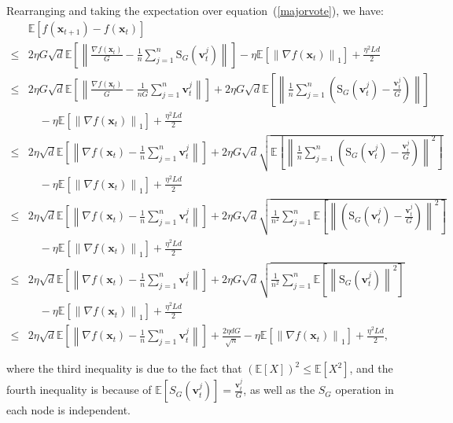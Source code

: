 \documentclass{article}
\newcommand{\E}{\mathbb{E}}
\newcommand{\Norm}[1]{\left\|#1\right\|}
\def \E {\mathbb{E}}
\def \v {\mathbf{v}}
\def \x {\mathbf{x}}
\def \E {\mathbb{E}}
\def \x {\mathbf{x}}
\def \v {\mathbf{v}}
\begin{document}
Rearranging and taking the expectation over equation~(\ref{majorvote}), we have:
\begin{equation}\label{majorvote2}
    \begin{split}
&\E\left[f(\x_{t+1}) - f(\x_t)\right]\\
\leq& 2\eta G\sqrt{d}  \E\left[ \Norm{\frac{\nabla f(\x_t)}{G} - \frac{1}{n}\sum_{j=1}^n \operatorname{S_\textit{G}}(\v_t^j)} \right]-\eta \E\left[ \Norm{ \nabla f(\x_t)}_1 \right]+ \frac{\eta^2 Ld}{2} \\
\leq &  2\eta G\sqrt{d}   \E\left[\Norm{ \frac{\nabla f(\x_t)}{G} - \frac{1}{nG}\sum_{j=1}^n \v_t^j}\right]+ 2\eta G\sqrt{d} \E\left[  \Norm{ \frac{1}{n}\sum_{j=1}^n \left(\operatorname{S_\textit{G}}(\v_t^j)-\frac{\v_t^j}{G}\right)} \right]\\
&\quad -\eta \E\left[ \Norm{\nabla f(\x_{t}) }_1\right]+ \frac{\eta^2 Ld}{2}\\
\leq &  2\eta\sqrt{d}   \E\left[\Norm{ \nabla f(\x_t) - \frac{1}{n}\sum_{j=1}^n \v_t^j}\right]+ 2\eta G\sqrt{d} \sqrt{\E\left[  \Norm{ \frac{1}{n}\sum_{j=1}^n \left(\operatorname{S_\textit{G}}(\v_t^j)-\frac{\v_t^j}{G}\right)}^2 \right]}\\
&\quad -\eta \E\left[ \Norm{\nabla f(\x_{t}) }_1\right]+ \frac{\eta^2 Ld}{2}\\
\leq &  2\eta\sqrt{d}   \E\left[\Norm{ \nabla f(\x_t) - \frac{1}{n}\sum_{j=1}^n \v_t^j}\right]+ 2\eta G\sqrt{d} \sqrt{\frac{1}{n^2}\sum_{j=1}^n\E\left[  \Norm{  \left(\operatorname{S_\textit{G}}(\v_t^j)-\frac{\v_t^j}{G}\right)}^2 \right]}\\
&\quad -\eta \E\left[ \Norm{\nabla f(\x_{t}) }_1\right]+ \frac{\eta^2 Ld}{2}\\
\leq &  2\eta\sqrt{d}   \E\left[\Norm{ \nabla f(\x_t) - \frac{1}{n}\sum_{j=1}^n \v_t^j}\right]+ 2\eta G\sqrt{d} \sqrt{\frac{1}{n^2}\sum_{j=1}^n\E\left[  \Norm{ \operatorname{S_\textit{G}}(\v_t^j)}^2 \right]}\\
&\quad -\eta \E\left[ \Norm{\nabla f(\x_{t}) }_1\right]+ \frac{\eta^2 Ld}{2}\\
\leq &  2\eta\sqrt{d}   \E\left[\Norm{ \nabla f(\x_t) - \frac{1}{n}\sum_{j=1}^n \v_t^j}\right]+ \frac{2\eta d G}{\sqrt{n}} -\eta \E\left[ \Norm{\nabla f(\x_{t}) }_1\right]+ \frac{\eta^2 Ld}{2},
    \end{split}
\end{equation}



where the third inequality is due to the fact that $\left(\E\left[X\right]\right)^2 \leq \E\left[X^2\right]$, and the fourth inequality is because of $\E\left[S_G\left(\v_t^j\right) \right] = \frac{\v_t^j}{G}$, as well as the $S_G$ operation in each node is independent.
\end{document}
